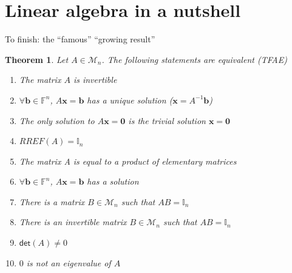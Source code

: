 \documentclass{beamer}
\def\IF{\mathbb{F}}
\def\II{\mathbb{I}}
\def\bb{\mathbf{b}}
\def\bx{\mathbf{x}}
\def\b0{\mathbf{0}}
\def\M{\mathcal{M}}
\renewcommand{\det}{\ensuremath{\mathsf{det}}}
\newtheorem{importanttheorem}[theorem]{Theorem}
\begin{document}
\section{Linear algebra in a nutshell}
\begin{frame}{To finish: the ``famous'' ``growing result''}
\begin{importanttheorem}
Let $A\in\M_n$. The following statements are equivalent (TFAE)
\begin{enumerate}
\item The matrix $A$ is invertible
\item $\forall\bb\in\IF^n$, $A\bx = \bb$ has a unique solution ($\bx=A^{-1}\bb$)
\item The only solution to $A\bx = \b0$ is the trivial solution $\bx = \b0$
\item $RREF(A)=\II_n$
\item The matrix A is equal to a product of elementary matrices
\item $\forall\bb\in\IF^n$, $A\bx = \bb$ has a solution
\item There is a matrix $B\in\M_n$ such that $AB = \II_n$
\item There is an invertible matrix $B\in\M_n$ such that $AB = \II_n$
\item $\det(A)\neq 0$
\item $0$ is not an eigenvalue of $A$
\end{enumerate}
\end{importanttheorem}
\end{frame}


\begin{frame}

\end{frame}
\end{document}
